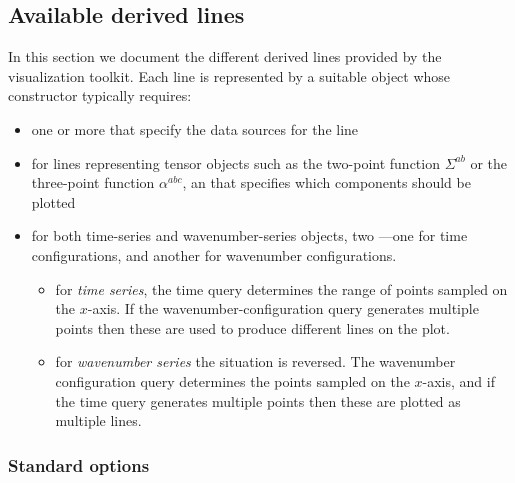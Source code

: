 \documentclass[11pt,a4paper]{article}
\newcommand{\semibold}[1]{{\fontseries{b}\selectfont{#1}}}
\begin{document}
\subsection{Available derived lines}
\label{sec:derived-lines}

In this section we document
the different derived lines provided by the visualization toolkit.
Each line is represented by a suitable object whose constructor
typically requires:
\begin{itemize}
    \item one or more \semibold{task objects} that specify the data sources
    for the line    
    \item for lines representing tensor objects such as the two-point
    function $\Sigma^{ab}$ or the three-point function $\alpha^{abc}$,
    an \semibold{index selector} that specifies which components should be
    plotted
    \item for both time-series and wavenumber-series objects,
    two \semibold{SQL query expressions}---one for time configurations, and
    another for wavenumber configurations.
    \begin{itemize}
        \item for \emph{time series}, the time query determines
        the range of points sampled on the $x$-axis. If the wavenumber-configuration
        query generates multiple points then these are used to produce different
        lines on the plot.
        
        \item for \emph{wavenumber series} the situation is reversed. The
        wavenumber configuration query determines the points sampled on the
        $x$-axis, and if the time query generates multiple points then these
        are plotted as multiple lines.
    \end{itemize}
\end{itemize}

\subsubsection{Standard options}
\label{sec:derived-standard-options}
\end{document}
